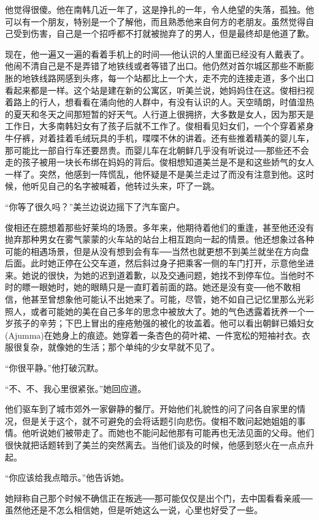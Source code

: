 他觉得很傻。他在南韩几近一年了，这是挣扎的一年，令人绝望的失落，孤独。他可以有一个朋友，特别是一个了解他，而且熟悉他来自何方的老朋友。虽然觉得自己受到伤害，自己是一个招呼都不打就被抛弃了的男人，但是最终却是他道了歉。

现在，他一遍又一遍的看着手机上的时间──他认识的人里面已经没有人戴表了。他闹不清自己是不是弄错了地铁线或者等错了出口。他仍然对首尔城区那些不断膨胀的地铁线路网感到头疼，每一个站都比上一个大，走不完的连接走道，多个出口看起来都是一样。这个站是建在新的公寓区，听美兰说，她妈妈住在这。俊相扫视着路上的行人，想看看在涌向他的人群中，有没有认识的人。天空晴朗，时值湿热的夏天和冬天之间那短暂的好天气。人行道上很拥挤，大多数是女人，因为那天是工作日，大多南韩妇女有了孩子后就不工作了。俊相看见妇女们，一个个穿着紧身牛仔裤，对着挂着毛绒玩具的手机，喋喋不休的讲着。还有些推着精美的婴儿车，那可能比一部自行车还要昂贵。而婴儿车在北朝鲜几乎没有听说过──那些还不会走的孩子被用一块长布绑在妈妈的背后。俊相想知道美兰是不是和这些娇气的女人一样了。突然，他感到一阵慌乱，他怀疑是不是美兰走过了而没有注意到他。这时候，他听见自己的名字被喊着，他转过头来，吓了一跳。

“你等了很久吗？”美兰边说边摇下了汽车窗户。

俊相还在臆想着那些好莱坞的场景。多年来，他期待着他们的重逢，甚至他还没有抛弃那种男女在雾气蒙蒙的火车站的站台上相互跑向一起的情景。他还想象过各种可能的相遇场景，但是从没有想到会有车──当然也就更想不到美兰就坐在方向盘后面。此时她正停在公交车道，然后斜过身子把乘客一侧的车门打开，示意他坐进来。她说的很快，为她的迟到道着歉，以及交通问题，她找不到停车位。当他时不时的瞟一眼她时，她的眼睛只是一直盯着前面的路。她还是没有变──他不敢相信，他甚至曾想象他可能认不出她来了。可能，尽管，她不如自己记忆里那么光彩照人，或者可能她的美在自己多年的思念中被放大了。她的气色透露着抚养一个一岁孩子的辛劳；下巴上冒出的痤疮勉强的被化的妆盖着。他可以看出朝鲜已婚妇女(Ajumma)在她身上的痕迹。她穿着一条杏色的荷叶裙、一件宽松的短袖衬衣。衣服很复杂，就像她的生活；那个单纯的少女早就不见了。

“你很平静。”他打破沉默。

“不、不、我心里很紧张。”她回应道。

他们驱车到了城市郊外一家僻静的餐厅。开始他们礼貌性的问了问各自家里的情况，但是关于这个，就不可避免的会将话题引向悲伤。俊相不敢问起她姐姐的事情。他听说她们被带走了。而她也不能问起他那有可能再也无法见面的父母。他们很快就把话题转到了美兰的突然离去。当他们谈及的时候，他感到怒火在一点点升起。

“你应该给我点暗示。”他告诉她。

她辩称自己那个时候不确信正在叛逃──那可能仅仅是出个门，去中国看看亲戚──虽然他还是不怎么相信她，但是听她这么一说，心里也好受了一些。

